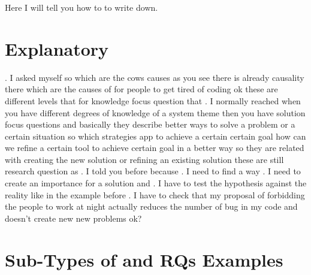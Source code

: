\documentclass[conference, compsoc, twoside]{IEEEtran}
\begin{document}
Here I will tell you how to to write down.

\section{Explanatory} %
\label{sec:explanatory}

.
I asked myself so which are the cows causes as you see there is already causality there which are the causes of for people to get tired of coding ok these are different levels that for knowledge focus question that .
I normally reached when you have different degrees of knowledge of a system theme then you have solution focus questions and basically they describe better ways to solve a problem or a certain situation so which strategies app to achieve a certain certain goal how can we refine a certain tool to achieve certain goal in a better way so they are related with creating the new solution or refining an existing solution these are still research question as .
I told you before because .
I need to find a way .
I need to create an importance for a solution and .
I have to test the hypothesis against the reality like in the example before .
I have to check that my proposal of forbidding the people to work at night actually reduces the number of bug in my code and doesn't create new new problems ok?

\section{Sub-Types of and RQs Examples} %
\end{document}
